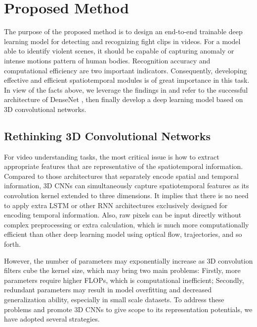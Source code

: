 \documentclass[10pt,twocolumn,letterpaper]{article}
\begin{document}
	

\section{Proposed Method}
\label{sec:3}

The purpose of the proposed method is to design an end-to-end trainable deep learning model for detecting and recognizing fight clips in videos. 
For a model able to identify violent scenes, it should be capable of capturing anomaly or intense motions pattern of human bodies. 
Recognition accuracy and computational efficiency are two important indicators.
Consequently, developing effective and efficient spatiotemporal modules is of great importance in this task.
In view of the facts above, we leverage the findings in \cite{3dcnn_1, 3dcnn_2, r2+1d} and refer to the successful architecture of DenseNet \cite{densenet}, then finally develop a deep learning model based on 3D convolutional networks.

\subsection{Rethinking 3D Convolutional Networks}

For video understanding tasks, the most critical issue is how to extract appropriate features that are representative of the spatiotemporal information.
Compared to those architectures that separately encode spatial and temporal information, 3D CNNs can simultaneously capture spatiotemporal features as its convolution kernel extended to three dimensions. 
It implies that there is no need to apply extra LSTM or other RNN architectures exclusively designed for encoding temporal information. 
Also, raw pixels can be input directly without complex preprocessing or extra calculation, which is much more computationally efficient than other deep learning model using optical flow, trajectories, and so forth.

However, the number of parameters may  exponentially increase as 3D convolution filters cube the kernel size, which may bring two main problems: 
Firstly, more parameters require higher FLOPs, which is computational inefficient; 
Secondly, redundant parameters may result in model overfitting and decreased generalization ability, especially in small scale datasets. 
To address these problems and promote 3D CNNs to give scope to its representation potentials, we have adopted several strategies.
\end{document}
